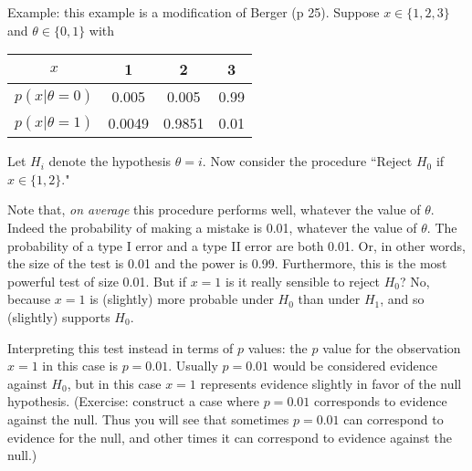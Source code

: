 \documentclass[times,11pt]{article}
\def\ffA{f_F}
\def\fsA{f_S}
\def\nsA{{n_s}}
\def\nfA{{n_f}}
\def\data{x}
\begin{document}
Example: this example is a modification of Berger (p 25). Suppose $\data \in \{1,2,3\}$ and $\theta \in \{0,1\}$
with 
\begin{table}[h!]
\center
\begin{tabular}{c|c|c|c}
$\data$ & 1 & 2 & 3 \\ \hline
$p(\data|\theta=0)$ & 0.005 & 0.005 & 0.99 \\
$p(\data|\theta=1)$ & 0.0049 & 0.9851 & 0.01 
\end{tabular}
\end{table}

Let $H_i$ denote the hypothesis $\theta=i$.
Now consider the procedure ``Reject $H_0$ if $\data \in \{1,2\}$."

Note that, {\it on average} this procedure performs
well, whatever the value of $\theta$. Indeed
the probability of making a mistake is 0.01,
whatever the value of $\theta$. The probability of a type I error and a type II error are both 0.01.
Or, in other words, the size of the test is 0.01 and the power is 0.99.
Furthermore, this is the most powerful test of size 0.01. But
if $\data=1$ is it really sensible to reject $H_0$? No, because $\data=1$ is (slightly) more probable under $H_0$ than under $H_1$, and so (slightly) supports $H_0$. 

Interpreting this test instead in terms of $p$ values: the $p$ value for the observation $\data=1$ in this case is $p=0.01$. Usually $p=0.01$ would be considered
evidence against $H_0$, but in this case $\data=1$ represents evidence slightly in favor of the null hypothesis.
(Exercise: construct a case where $p=0.01$ corresponds to evidence against the null. Thus you will see that sometimes $p=0.01$ can correspond
to evidence for the null, and other times it can correspond to evidence against the null.)





\end{document}
